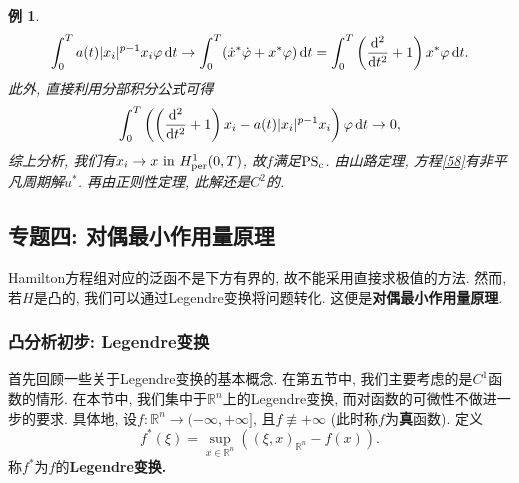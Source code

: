 \documentclass[12pt,a4paper]{article}
\newtheorem{example}[theorem]{例}
\begin{document}
\begin{example}
    \begin{equation*}
        \int_0^Ta(t)|x_i|^{p - 1}x_i\varphi \,{\rm d}t \rightarrow \int_0^T(\dot x^*\dot\varphi + x^*\varphi) \,{\rm d}t = \int_0^T\left(\frac{{\rm d}^2}{{\rm d}t^2} + 1\right)x^*\varphi \,{\rm d}t.
    \end{equation*}
    此外, 直接利用分部积分公式可得
    \begin{equation*}
        \int_0^T\left(\left(\frac{{\rm d}^2}{{\rm d}t^2} + 1\right)x_i - a(t)|x_i|^{p - 1}x_i\right)\varphi \,{\rm d}t \rightarrow 0,
    \end{equation*}
    综上分析, 我们有$x_i \rightarrow x\ {\rm in}\ H_{{\rm per}}^1(0, T)$, 故$f$满足${\rm PS_c}$.
    由山路定理, 方程\eqref{58}有非平凡周期解$u^*$. 再由正则性定理, 此解还是$C^2$的.
\end{example}

\subsection{专题四: 对偶最小作用量原理}

Hamilton方程组对应的泛函不是下方有界的, 故不能采用直接求极值的方法. 然而, 若$H$是凸的, 我们可以通过Legendre变换将问题转化.
这便是\textbf{对偶最小作用量原理}.

\subsubsection{凸分析初步: Legendre变换}

首先回顾一些关于Legendre变换的基本概念. 在第五节中, 我们主要考虑的是$C^1$函数的情形.
在本节中, 我们集中于$\mathbb{R}^n$上的Legendre变换, 而对函数的可微性不做进一步的要求.
具体地, 设$f\colon \mathbb{R}^n \rightarrow (-\infty, +\infty]$, 且$f \not\equiv +\infty$ (此时称$f$为\textbf{真}函数).
定义 
\begin{equation*}
    \boxed{f^*(\xi) = \sup_{x \in \mathbb{R}^n}((\xi, x)_{\mathbb{R}^n} - f(x))}.
\end{equation*}
称$f^*$为$f$的\textbf{Legendre变换.}
\end{document}
